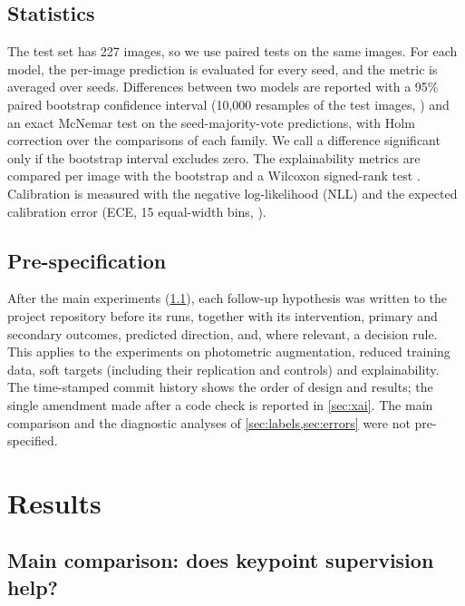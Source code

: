 \documentclass[11pt]{article}
\begin{document}
\subsection{Statistics}
The test set has 227 images, so we use paired tests on the same images. For each model, the per-image
prediction is evaluated for every seed, and the metric is averaged over seeds. Differences between two models
are reported with a 95\% paired bootstrap confidence interval (10{,}000 resamples of the test images,
\citealp{efron1993bootstrap}) and an exact McNemar test \citep{mcnemar1947} on the seed-majority-vote
predictions, with Holm correction \citep{holm1979} over the comparisons of each family. We call a difference
significant only if the bootstrap interval excludes zero. The explainability metrics are compared per image
with the bootstrap and a Wilcoxon signed-rank test \citep{wilcoxon1945}. Calibration is measured with the
negative log-likelihood (NLL) and the expected calibration error (ECE, 15 equal-width bins,
\citealp{guo2017calibration}).

\subsection{Pre-specification}
After the main experiments (\cref{sec:main}), each follow-up hypothesis was written to the project repository
before its runs, together with its intervention, primary and secondary outcomes, predicted direction, and,
where relevant, a decision rule. This applies to the experiments on photometric augmentation, reduced training
data, soft targets (including their replication and controls) and explainability. The time-stamped commit
history shows
the order of design and results; the single amendment made after a code check is reported in \cref{sec:xai}.
The main comparison and the diagnostic analyses of \cref{sec:labels,sec:errors} were not pre-specified.

\section{Results}
\label{sec:results}

\subsection{Main comparison: does keypoint supervision help?}
\label{sec:main}
\end{document}
